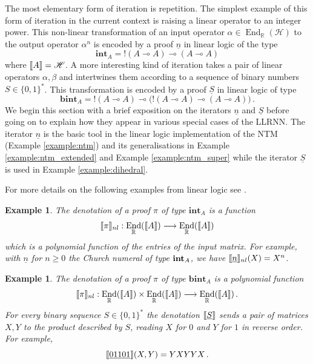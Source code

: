 \documentclass[english,letter paper,12pt,leqno]{article}
\theoremstyle{example}
\newtheorem{example}[theorem]{Example}
\numberwithin{equation}{section}
\DeclareMathOperator{\End}{End}
\begin{document}
The most elementary form of iteration is repetition. The simplest example of this form of iteration in the current context is raising a linear operator to an integer power. This non-linear transformation of an input operator $\alpha \in \End_{\mathbb{R}}(\mathscr{H})$ to the output operator $\alpha^n$ is encoded by a proof $\underline{n}$ in linear logic of the type
\[
\textbf{int}_A = {!}(A \multimap A) \multimap (A \multimap A)
\]
where $\llbracket A \rrbracket = \mathscr{H}$. A more interesting kind of iteration takes a pair of linear operators $\alpha, \beta$ and intertwines them according to a sequence of binary numbers $S \in \{0,1\}^*$. This transformation is encoded by a proof $\underline{S}$ in linear logic of type
\[
\textbf{bint}_A = {!}(A \multimap A) \multimap \big({!}(A \multimap A) \multimap (A \multimap A)\big)\,.
\]
We begin this section with a brief exposition on the iterators $\underline{n}$ and $\underline{S}$ before going on to explain how they appear in various special cases of the LLRNN. The iterator $\underline{n}$ is the basic tool in the linear logic implementation of the NTM (Example \ref{example:ntm}) and its generalisations in Example \ref{example:ntm_extended} and Example \ref{example:ntm_super} while the iterator $\underline{S}$ is used in Example \ref{example:dihedral}. 
\vspace{0.25cm}

For more details on the following examples from linear logic see \cite[\S 3]{murfetclift}. 

\begin{example}\label{example_1} The denotation of a proof $\pi$ of type $\textbf{int}_A$ is a function
\[
\den{\pi}_{nl}: \End_{\mathbb{R}}(\den{A}) \lto \End_{\mathbb{R}}(\den{A})
\]
which is a polynomial function of the entries of the input matrix. For example, with $\underline{n}$ for $n \ge 0$ the Church numeral of type $\textbf{int}_A$, we have $\llbracket \underline{n} \rrbracket_{nl}(X) = X^n$. %
\end{example}

\begin{example}\label{example_2} The denotation of a proof $\pi$ of type $\textbf{bint}_A$ is a polynomial function
\[
\den{\pi}_{nl}: \End_{\mathbb{R}}(\den{A}) \times \End_{\mathbb{R}}(\den{A}) \lto \End_{\mathbb{R}}(\den{A})\,.
\]
For every binary sequence $S \in \{0,1\}^*$ the denotation $\llbracket \underline{S} \rrbracket$ sends a pair of matrices $X,Y$ to the product described by $S$, reading $X$ for $0$ and $Y$ for $1$ in reverse order. For example,
\[
\llbracket \underline{01101} \rrbracket(X,Y) = Y X Y Y X\,.
\]
\end{example}
\end{document}
